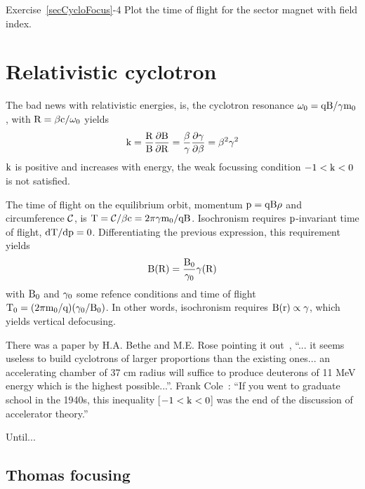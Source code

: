 \smallskip
\noindent {\small $\bullet$} Exercise~\ref{secCycloFocus}-4
Plot the time of flight for  the sector magnet with field index. 





\section{Relativistic cyclotron \label{secCycloRel}}

The bad news with relativistic energies, is, 
the cyclotron resonance $\rm \omega_0 = qB/\gamma m_0$, with $\rm R = \beta c / \omega_0$  yields  
\begin{equation} \rm
\label{EqCycloReson}
  k = \frac{R}{B}\frac{\partial B}{\partial R} = \frac{\beta}{\gamma} 
  \frac{\partial \gamma}{\partial \beta} = \beta^2 \gamma^2 
\end{equation}
$\rm k$ is positive and increases with energy, 
 the weak focussing condition $\rm -1<k<0$ is not satisfied. 

The time of flight on the equilibrium orbit, momentum $\rm p = qB\rho$ and circumference $\rm \mathcal{C}$, is 
$\rm T =  \mathcal{C}/ \beta c = 2\pi \gamma m_0 / qB$. 
    Isochronism requires $\rm p$-invariant time of flight, $\rm dT/dp=0$. Differentiating the previous expression,
this requirement yields 
\begin{equation} \rm
\label{EqCycloBgamma}
B(R) = \frac{B_0}{\gamma_0} \gamma(R)
\end{equation}
with $\rm B_0$ and $\rm \gamma_0$  some refence conditions and time of flight $\rm T_0 = (2\pi m_0/q)(\gamma_0/B_0)$.
In other words, isochronism requires $\rm  B(r) \propto \gamma$, which yields vertical defocusing. 

There was a paper by H.A. Bethe and M.E. Rose pointing it out~\cite{BetheRose}, 
``... it seems useless to build cyclotrons of larger proportions than the  
existing ones... an accelerating chamber of 37 cm radius will  suffice to 
produce deuterons of 11 MeV energy which is the highest possible...''. 
Frank Cole~: ``If you went to graduate school in the 1940s, this inequality [$\rm -1 <k < 0$] 
was the end of the discussion of accelerator theory.''

  Until...

\subsection{Thomas focusing}

